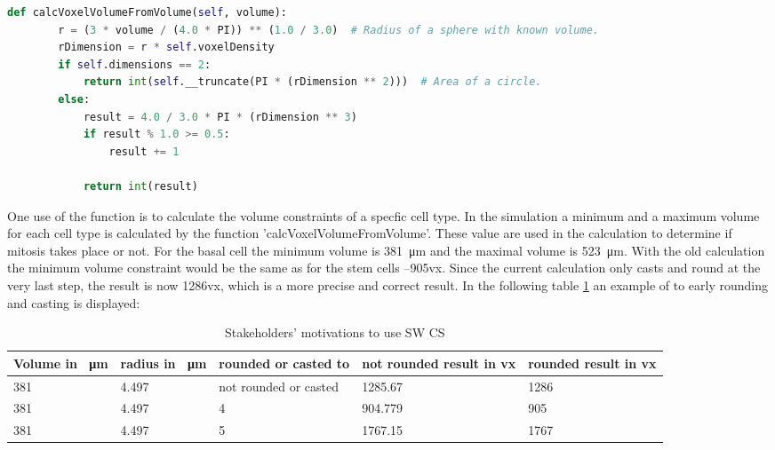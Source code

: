 \begin{lstlisting}[language=Python, caption = the same function as before but without approximation errors\, because the cast and the rounding is done after the calculation]
   def calcVoxelVolumeFromVolume(self, volume):
        r = (3 * volume / (4.0 * PI)) ** (1.0 / 3.0)  # Radius of a sphere with known volume.
        rDimension = r * self.voxelDensity
        if self.dimensions == 2:
            return int(self.__truncate(PI * (rDimension ** 2)))  # Area of a circle.
        else:
            result = 4.0 / 3.0 * PI * (rDimension ** 3)
            if result % 1.0 >= 0.5:
                result += 1

            return int(result)
\end{lstlisting}

One use of the function is to calculate the volume constraints of a specfic cell type. In the simulation a minimum and a maximum volume for each cell type is calculated by the function 'calcVoxelVolumeFromVolume'. These value are used in the calculation to determine if mitosis takes place or not. \newline
For the basal cell the minimum volume is \SI{381}{\micro\metre} and the maximal volume is \SI{523}{\micro\metre}. With the old calculation the minimum volume constraint would be the same as for the stem cells --905vx. Since the current calculation only casts and round at the very last step, the result is now 1286vx, which is a more precise and correct result. In the following table \ref{tbl:Approximation error} an example of to early rounding and casting is displayed:

\begin{table}[h]
\centering
\caption{Stakeholders' motivations to use \ac{SW CS}}
\renewcommand{\arraystretch}{1.5}
	\begin{tabularx}{\textwidth}{XXXXX}
		Volume in \SI{}{\micro\metre} & radius in \SI{}{\micro\metre} & rounded or casted to & not rounded result in vx & rounded result in vx  \\
		\hline
		381 & 4.497 & not rounded or casted &1285.67 & 1286 \\
		
		381 & 4.497 & 4 & 904.779 & 905\\
		
		381 & 4.497 & 5 & 1767.15 & 1767\\

	\end{tabularx}
	\label{tbl:Approximation error}
\end{table}

